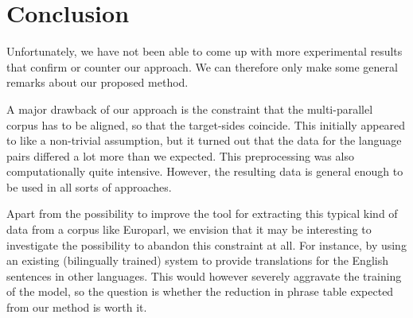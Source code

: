\documentclass[11pt]{article}
\begin{document}


\section{Conclusion}
Unfortunately, we have not been able to come up with more experimental results that confirm or counter our approach. We can therefore only make some general remarks about our proposed method.


A major drawback of our approach is the constraint that the multi-parallel corpus has to be aligned, so that the target-sides coincide. This initially appeared to like a non-trivial assumption, but it turned out that the data for the language pairs differed a lot more than we expected. This preprocessing was also computationally quite intensive. However, the resulting data is general enough to be used in all sorts of approaches.

Apart from the possibility to improve the tool for extracting this typical kind of data from a corpus like Europarl, we envision that it may be interesting to investigate the possibility to abandon this constraint at all. For instance, by using an existing (bilingually trained) system to provide translations for the English sentences in other languages. This would however severely aggravate the training of the model, so the question is whether the reduction in phrase table expected from our method is worth it.
\end{document}
